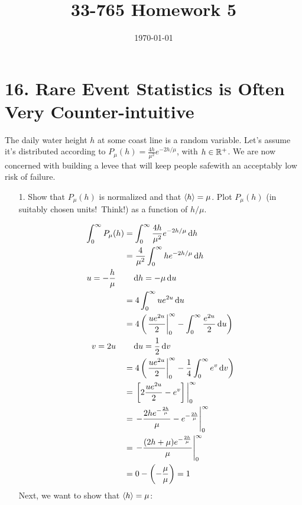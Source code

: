 \documentclass[a4paper,twoside]{article}
\title{33-765 Homework 5}
\date{\today}
\begin{document}
\maketitle

\section*{16. Rare Event Statistics is Often Very Counter-intuitive}
The daily water height $ h $ at some coast line is a random variable. Let's assume it's distributed according to $ P_{\mu}(h) = \frac{4h}{\mu^2} e^{-2 h / \mu} $, with $ h \in \mathbb{R}^+ $. We are now concerned with building a levee that will keep people safe\textemdash with an acceptably low risk of failure.
\begin{itemize}
    \item[1.] Show that $ P_{\mu}(h) $ is normalized and that $ \ev{h} = \mu $. Plot $ P_{\mu}(h) $ (in suitably chosen units!\ Think!) as a function of $ h / \mu $.
        \begin{problem}
            \begin{align}
                \int_0^{\infty} P_{\mu}(h) &= \int_0^{\infty} \frac{4h}{\mu^2} e^{-2h / \mu} \dd{h} \\
                &= \frac{4}{\mu^2} \int_0^{\infty} h e^{-2h / \mu} \dd{h} \\
                u = - \frac{h}{\mu} \quad & \quad \dd{h} = - \mu \dd{u} \\
                &= 4 \int_0^{\infty } u e^{2u} \dd{u} \\
                &= 4 \left( \eval{\frac{ue^{2u}}{2}}_{0}^{\infty} - \int_0^{\infty} \frac{e^{2u}}{2} \dd{u} \right) \\
                v = 2u \quad & \quad \dd{u} = \frac{1}{2} \dd{v} \\
                &= 4 \left( \eval{\frac{ue^{2u}}{2}}_{0}^{\infty} - \frac{1}{4} \int_0^{\infty} e^v \dd{v} \right) \\
                &= \eval{\left[2 \frac{u e^{2u}}{2} - e^v\right]}_{0}^{\infty} \\
                &= \eval{- \frac{2h e^{- \frac{2h}{\mu}}}{\mu} - e^{- \frac{2h}{\mu}}}_{0}^{\infty} \\
                &= \eval{- \frac{(2h + \mu) e^{- \frac{2h}{\mu}}}{\mu}}_{0}^{\infty} \\
                &= 0 - \left( - \frac{\mu}{\mu} \right) = 1
            \end{align}
            Next, we want to show that $ \ev{h} = \mu $:

\end{problem}
\end{itemize}
\end{document}
